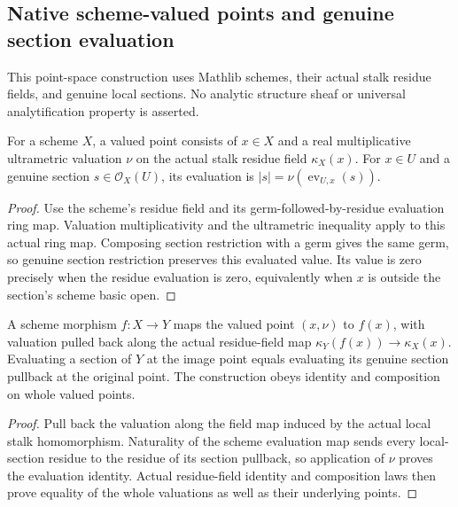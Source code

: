 \subsection{Native scheme-valued points and genuine section evaluation}
\label{subsec:native-scheme-valued-points}

This point-space construction uses Mathlib schemes, their actual stalk residue
fields, and genuine local sections. No analytic structure sheaf or universal
analytification property is asserted.

\begin{definition}
\label{scheme:valued-points}
\leanok
{}
For a scheme $X$, a valued point consists of $x\in X$ and a real multiplicative
ultrametric valuation $\nu$ on the actual stalk residue field $\kappa_X(x)$.
For $x\in U$ and a genuine section $s\in\mathcal O_X(U)$, its evaluation is
$|s|=\nu(\operatorname{ev}_{U,x}(s))$.
\end{definition}
\begin{proof}
Use the scheme's residue field and its germ-followed-by-residue evaluation ring
map. Valuation multiplicativity and the ultrametric inequality apply to this
actual ring map. Composing section restriction with a germ gives the same
germ, so genuine section restriction preserves this evaluated value. Its value is zero precisely when the residue evaluation is
zero, equivalently when $x$ is outside the section's scheme basic open.
\end{proof}

\begin{theorem}
\label{scheme:valued-point-pullback}
\leanok
{}
A scheme morphism $f:X\to Y$ maps the valued point $(x,\nu)$ to $f(x)$,
with valuation pulled back along the actual residue-field map
$\kappa_Y(f(x))\to\kappa_X(x)$. Evaluating a section of $Y$ at the image
point equals evaluating its genuine section pullback at the original point.
The construction obeys identity and composition on whole valued points.
\end{theorem}
\begin{proof}
Pull back the valuation along the field map induced by the actual local stalk
homomorphism. Naturality of the scheme evaluation map sends every local-section
residue to the residue of its section pullback, so application of $\nu$ proves
the evaluation identity. Actual residue-field identity and composition laws
then prove equality of the whole valuations as well as their underlying points.
\end{proof}

